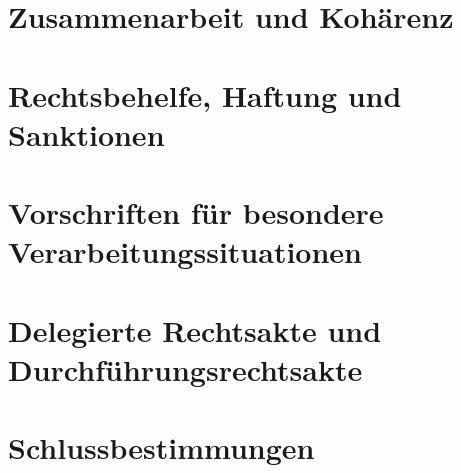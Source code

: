 

\part{Zusammenarbeit und Kohärenz}


\part{Rechtsbehelfe, Haftung und Sanktionen}


\part{Vorschriften für besondere Verarbeitungssituationen}

\part{Delegierte Rechtsakte und Durchführungsrechtsakte}


\part{Schlussbestimmungen}



